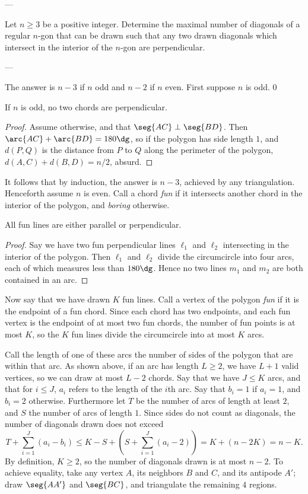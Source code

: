 
---

Let $n\ge3$ be a positive integer. Determine the maximal number of diagonals of a regular $n$-gon that can be drawn such that any two drawn diagonals which intersect in the interior of the $n$-gon are perpendicular.

---

The answer is $n-3$ if $n$ odd and $n-2$ if $n$ even. First suppose $n$ is odd.
\setcounter{iclaim}0
\begin{iclaim}
    If $n$ is odd, no two chords are perpendicular.
\end{iclaim}
\begin{proof}
    Assume otherwise, and that $\seg{AC}\perp\seg{BD}$. Then $\arc{AC}+\arc{BD}=180\dg$, so if the polygon has side length $1$, and $d(P,Q)$ is the distance from $P$ to $Q$ along the perimeter of the polygon, $d(A,C)+d(B,D)=n/2$, absurd.
\end{proof}

It follows that by induction, the answer is $n-3$, achieved by any triangulation. Henceforth assume $n$ is even. Call a chord \emph{fun} if it intersects another chord in the interior of the polygon, and \emph{boring} otherwise.
\begin{iclaim}
    All fun lines are either parallel or perpendicular.
\end{iclaim}
\begin{proof}
    Say we have two fun perpendicular lines $\ell_1$ and $\ell_2$ intersecting in the interior of the polygon. Then $\ell_1$ and $\ell_2$ divide the circumcircle into four arcs, each of which measures less than $180\dg$. Hence no two lines $m_1$ and $m_2$ are both contained in an arc.
\end{proof}

Now say that we have drawn $K$ fun lines. Call a vertex of the polygon \emph{fun} if it is the endpoint of a fun chord. Since each chord has two endpoints, and each fun vertex is the endpoint of at most two fun chords, the number of fun points is at most $K$, so the $K$ fun lines divide the circumcircle into at most $K$ arcs.

Call the length of one of these arcs the number of sides of the polygon that are within that arc. As shown above, if an arc has length $L\ge2$, we have $L+1$ valid vertices, so we can draw at most $L-2$ chords. Say that we have $J\le K$ arcs, and that for $i\le J$, $a_i$ refers to the length of the $i$th arc. Say that $b_i=1$ if $a_i=1$, and $b_i=2$ otherwise. Furthermore let $T$ be the number of arcs of length at least $2$, and $S$ the number of arcs of length $1$. Since sides do not count as diagonals, the number of diagonals drawn does not exceed \[T+\sum_{i=1}^J(a_i-b_i)\le K-S+\left(S+\sum_{i=1}^J(a_i-2)\right)=K+(n-2K)=n-K.\]
By definition, $K\ge2$, so the number of diagonals drawn is at most $n-2$. To achieve equality, take any vertex $A$, its neighbors $B$ and $C$, and its antipode $A'$; draw $\seg{AA'}$ and $\seg{BC}$, and triangulate the remaining $4$ regions.
